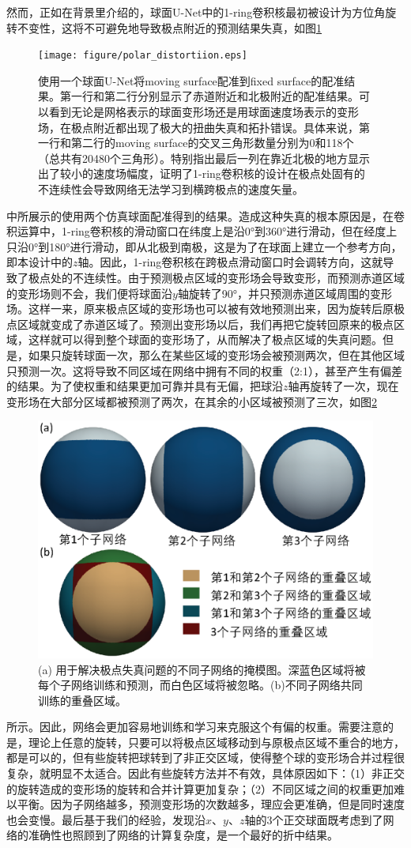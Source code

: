 然而，正如在背景里介绍的，球面U-Net中的1-ring卷积核最初被设计为方位角旋转不变性，这将不可避免地导致极点附近的预测结果失真，如图\ref{fig:polar_distortiion}
\begin{figure}[h]
	\centering
	\texttt{[image: figure/polar\_distortiion.eps]}
	\caption{使用一个球面U-Net将moving surface配准到fixed surface的配准结果。第一行和第二行分别显示了赤道附近和北极附近的配准结果。可以看到无论是网格表示的球面变形场还是用球面速度场表示的变形场，在极点附近都出现了极大的扭曲失真和拓扑错误。具体来说，第一行和第二行的moving surface的交叉三角形数量\cite{moller1997fast}分别为0和118个（总共有20480个三角形）。特别指出最后一列在靠近北极的地方显示出了较小的速度场幅度，证明了1-ring卷积核的设计在极点处固有的不连续性会导致网络无法学习到横跨极点的速度矢量。}
	\label{fig:polar_distortiion}
\end{figure}
中所展示的使用两个仿真球面配准得到的结果。造成这种失真的根本原因是，在卷积运算中，1-ring卷积核的滑动窗口在纬度上是沿0°到360°进行滑动，但在经度上只沿0°到180°进行滑动，即从北极到南极，这是为了在球面上建立一个参考方向，即本设计中的$z$轴。因此，1-ring卷积核在跨极点滑动窗口时会调转方向，这就导致了极点处的不连续性。由于预测极点区域的变形场会导致变形，而预测赤道区域的变形场则不会，我们便将球面沿$y$轴旋转了90°，并只预测赤道区域周围的变形场。这样一来，原来极点区域的变形场也可以被有效地预测出来，因为旋转后原极点区域就变成了赤道区域了。预测出变形场以后，我们再把它旋转回原来的极点区域，这样就可以得到整个球面的变形场了，从而解决了极点区域的失真问题。但是，如果只旋转球面一次，那么在某些区域的变形场会被预测两次，但在其他区域只预测一次。这将导致不同区域在网络中拥有不同的权重（2:1），甚至产生有偏差的结果。为了使权重和结果更加可靠并具有无偏，把球沿$z$轴再旋转了一次，现在变形场在大部分区域都被预测了两次，在其余的小区域被预测了三次，如图\ref{fig:S3Reg_index}
\begin{figure}[h]
	\centering
	\includegraphics[width=0.67\linewidth]{figure/index.eps}
	\caption{(a) 用于解决极点失真问题的不同子网络的掩模图。深蓝色区域将被每个子网络训练和预测，而白色区域将被忽略。(b)不同子网络共同训练的重叠区域。}
	\label{fig:S3Reg_index}
\end{figure}
所示。因此，网络会更加容易地训练和学习来克服这个有偏的权重。需要注意的是，理论上任意的旋转，只要可以将极点区域移动到与原极点区域不重合的地方，都是可以的，但有些旋转把球转到了非正交区域，使得整个球的变形场合并过程很复杂，就明显不太适合。因此有些旋转方法并不有效，具体原因如下：（1）非正交的旋转造成的变形场的旋转和合并计算更加复杂；（2）不同区域之间的权重更加难以平衡。因为子网络越多，预测变形场的次数越多，理应会更准确，但是同时速度也会变慢。最后基于我们的经验，发现沿$x$、$y$、$z$轴的3个正交球面既考虑到了网络的准确性也照顾到了网络的计算复杂度，是一个最好的折中结果。

